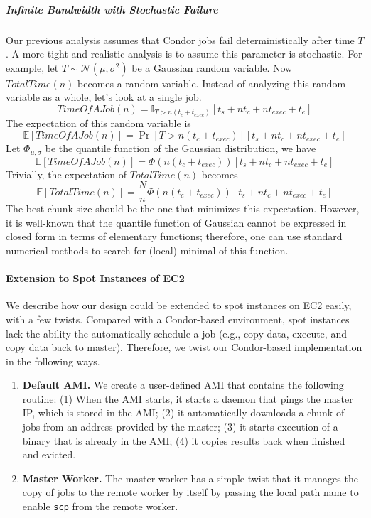 \documentclass[11pt]{article}
\begin{document}
\subparagraph*{Infinite Bandwidth with Stochastic Failure}

Our previous analysis assumes that Condor jobs fail
deterministically after time $T$. A more tight and realistic
analysis is to assume this parameter is stochastic. For example,
let $T\sim\mathcal{N}(\mu, \sigma^2)$ be a Gaussian random variable.
Now $TotalTime(n)$ becomes a random variable.
Instead of analyzing this random variable as a whole, let's
look at a single job.
\[
TimeOfAJob(n) = \mathbb{I}_{T>n(t_c+t_{exec})} \left[ t_s + nt_c + nt_{exec}  + t_e \right]
\]
The expectation of this random variable is
\[
\mathbb{E}\left[TimeOfAJob(n)\right] = \Pr[T>n(t_c+t_{exec})] \left[ t_s + nt_c + nt_{exec}  + t_e \right]
\]
Let $\Phi_{\mu,\sigma}$ be the quantile function
of the Gaussian distribution, we have
\[
\mathbb{E}\left[TimeOfAJob(n)\right] = \Phi(n(t_c+t_{exec})) \left[ t_s + nt_c + nt_{exec}  + t_e \right]
\]
Trivially, the expectation of $TotalTime(n)$ becomes
\[
\mathbb{E}\left[TotalTime(n)\right] = \frac{N}{n} \Phi(n(t_c+t_{exec})) \left[ t_s + nt_c + nt_{exec}  + t_e \right]
\]
The best chunk size should be the one that minimizes this 
expectation. However, it is well-known that the quantile
function of Gaussian cannot be expressed in closed form in 
terms of elementary functions; therefore, one can use
standard numerical methods to search for (local) minimal
of this function.


\paragraph*{Extension to Spot Instances of EC2}

We describe how our design could be extended to spot instances
on EC2 easily, with a few twists. Compared with a Condor-based
environment, spot instances lack the ability the automatically
schedule a job (e.g., copy data, execute, and copy data back
to master). Therefore, we twist our Condor-based implementation
in the following ways.
\begin{enumerate}
\item {\bf Default AMI.} We create a user-defined AMI that contains
the following routine: (1) When the AMI starts, it starts a daemon
that pings the master IP, which is stored in the AMI; (2) it
automatically downloads a chunk of jobs from an address provided
by the master; (3) it starts execution of a binary that is
already in the AMI; (4) it copies results back when finished
and evicted.
\item {\bf Master Worker.} The master worker has a simple twist
that it manages the copy of jobs to the remote worker by itself
by passing the local path name to enable \texttt{scp} from 
the remote worker. 
\end{enumerate}
\end{document}
